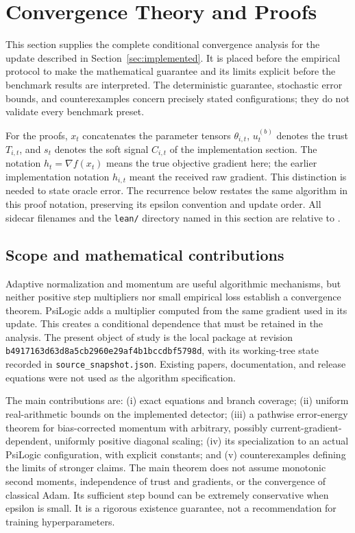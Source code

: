 \documentclass[11pt,a4paper]{article}
\theoremstyle{definition}
\theoremstyle{remark}
\begin{document}
\section{Convergence Theory and Proofs}\label{sec:convergence}
This section supplies the complete conditional convergence analysis for the
update described in Section~\ref{sec:implemented}. It is placed before the
empirical protocol to make the mathematical guarantee and its limits explicit
before the benchmark results are interpreted. The deterministic guarantee,
stochastic error bounds, and counterexamples concern precisely stated
configurations; they do not validate every benchmark preset.

For the proofs, $x_t$ concatenates the parameter tensors $\theta_{i,t}$,
$u_t^{(b)}$ denotes the trust $T_{i,t}$, and $s_t$ denotes the soft signal
$C_{i,t}$ of the implementation section. The notation $h_t=\nabla f(x_t)$
means the true objective gradient here; the earlier implementation notation
$h_{i,t}$ meant the received raw gradient. This distinction is needed to state
oracle error. The recurrence below restates the same algorithm in this proof
notation, preserving its epsilon convention and update order. All sidecar
filenames and the \texttt{lean/} directory named in this section are relative
to .
\setlength{\parskip}{0pt}
\subsection{Scope and mathematical contributions}
Adaptive normalization and momentum are useful algorithmic mechanisms, but
neither positive step multipliers nor small empirical loss establish a
convergence theorem. PsiLogic adds a multiplier computed from the same gradient
used in its update. This creates a conditional dependence that must be retained
in the analysis. The present object of study is the local package at revision
\texttt{b4917163d63d8a5cb2960e29af4b1bccdbf5798d}, with its working-tree state
recorded in \texttt{source\_snapshot.json}. Existing papers, documentation, and
release equations were not used as the algorithm specification.

The main contributions are: (i) exact equations and branch coverage;
(ii) uniform real-arithmetic bounds on the implemented detector;
(iii) a pathwise error-energy theorem for bias-corrected momentum with arbitrary,
possibly current-gradient-dependent, uniformly positive diagonal scaling;
(iv) its specialization to an actual PsiLogic configuration, with explicit
constants; and (v) counterexamples defining the limits of stronger claims.
The main theorem does not assume monotonic second moments, independence of
trust and gradients, or the convergence of classical Adam. Its sufficient step
bound can be extremely conservative when epsilon is small. It is a rigorous
existence guarantee, not a recommendation for training hyperparameters.
\end{document}
